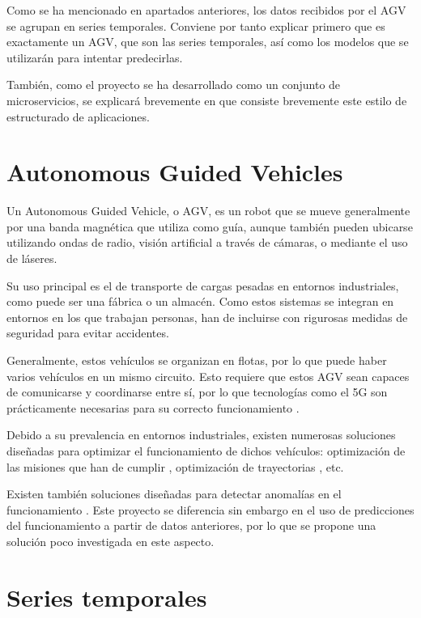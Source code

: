 
Como se ha mencionado en apartados anteriores, los datos recibidos por el AGV se agrupan en series temporales. Conviene por tanto explicar
primero que es exactamente un AGV, que son las series temporales, así como los modelos que se utilizarán para intentar predecirlas.

También, como el proyecto se ha desarrollado como un conjunto de microservicios, se explicará brevemente en 
que consiste brevemente este estilo de estructurado de aplicaciones.

\section{Autonomous Guided Vehicles}

Un Autonomous Guided Vehicle, o AGV, es un robot que se mueve generalmente por una banda magnética que utiliza 
como guía, aunque también pueden ubicarse utilizando ondas de radio, visión artificial a través de cámaras,
o mediante el uso de láseres.

Su uso principal es el de transporte de cargas pesadas en entornos industriales, como puede ser una fábrica 
o un almacén. Como estos sistemas se integran en entornos en los que trabajan personas, han de incluirse con 
rigurosas medidas de seguridad para evitar accidentes.

Generalmente, estos vehículos se organizan en flotas, por lo que puede haber varios vehículos en un mismo circuito.
Esto requiere que estos AGV sean capaces de comunicarse y coordinarse entre sí, por lo que tecnologías como el 5G 
son prácticamente necesarias para su correcto funcionamiento \cite{10.1007/978-3-030-50426-7_25}.

Debido a su prevalencia en entornos industriales, existen numerosas soluciones diseñadas para optimizar 
el funcionamiento de dichos vehículos: optimización de las misiones que han de cumplir \cite{XIDIAS201134},
optimización de trayectorias \cite{8022960}, etc. 

Existen también soluciones diseñadas para detectar anomalías en el funcionamiento \cite{9341386}. Este proyecto
se diferencia sin embargo en el uso de predicciones del funcionamiento a partir de datos anteriores, por lo 
que se propone una solución poco investigada en este aspecto.

\section{Series temporales}

